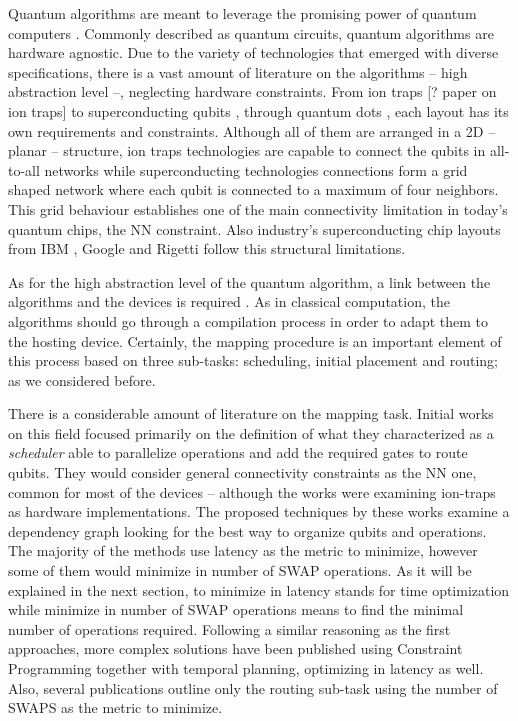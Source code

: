 Quantum algorithms are meant to leverage the promising power of quantum computers \cite{coles18:quant_algor_implem_begin}.
Commonly described as quantum circuits, quantum algorithms are hardware agnostic.
Due to the variety of technologies that emerged with diverse specifications, there is a vast amount of literature on the algorithms -- high abstraction level --, neglecting hardware constraints.
From ion traps [? paper on ion traps] to superconducting qubits \cite{Barends_2014,Versluis_2017}, through quantum dots \cite{Hill_2015,Li_2018}, each layout has its own requirements and constraints.
Although all of them are arranged in a 2D -- planar -- structure, ion traps technologies are capable to connect the qubits in all-to-all networks while superconducting technologies connections form a grid shaped network where each qubit is connected to a maximum of four neighbors.
This grid behaviour establishes one of the main connectivity limitation in today's quantum chips, the NN constraint.
Also industry's superconducting chip layouts from IBM \cite{IBM_QX}, Google \cite{boixo16:charac_quant_suprem_near_term_devic} and Rigetti \cite{Sete_2016} follow this structural limitations.

As for the high abstraction level of the quantum algorithm, a link between the algorithms and the devices is required \cite{Fu_2016}.
As in classical computation, the algorithms should go through a compilation process in order to adapt them to the hosting device.
Certainly, the mapping procedure is an important element of this process based on three sub-tasks: scheduling, initial placement and routing; as we considered before.

There is a considerable amount of literature on the mapping task.
Initial works on this field \cite{Metodi_2006,Whitney_2007,Bahreini_2015} focused primarily on the definition of what they characterized as a \emph{scheduler} able to parallelize operations and add the required gates to route qubits.
They would consider general connectivity constraints as the NN one, common for most of the devices -- although the works were examining ion-traps as hardware implementations.
The proposed techniques by these works examine a dependency graph looking for the best way to organize qubits and operations.
The majority of the methods use latency as the metric to minimize, however some of them \cite{Farghadan_2017} would minimize in number of SWAP operations.
As it will be explained in the next section, to minimize in latency stands for time optimization while minimize in number of SWAP operations means to find the minimal number of operations required.
Following a similar reasoning as the first approaches, more complex solutions \cite{booth18:compar_integ_const_progr_tempor} have been published using Constraint Programming together with temporal planning, optimizing in latency as well.
Also, several publications \cite{Lye_2015,Wille_2016} outline only the routing sub-task using the number of SWAPS as the metric to minimize.

